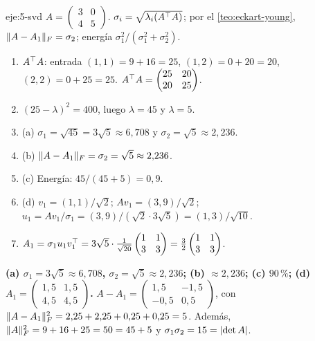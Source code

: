 \begin{solucion}{eje:5-svd}
\datos $A=\begin{pmatrix}3&0\\4&5\end{pmatrix}$.
\planteamiento $\sigma_i=\sqrt{\lambda_i(A^{\top} A)}$; por el \cref{teo:eckart-young}, $\lVert A-A_1\rVert_F=\sigma_2$; energía $\sigma_1^{2}/(\sigma_1^{2}+\sigma_2^{2})$.
\pasos
\begin{enumerate}[label=\arabic*.]
  \item $A^{\top} A$: entrada $(1,1)=9+16=25$, $(1,2)=0+20=20$, $(2,2)=0+25=25$. $A^{\top} A=\begin{pmatrix}25&20\\20&25\end{pmatrix}$.
  \item $(25-\lambda)^{2}=400$, luego $\lambda=45$ y $\lambda=5$.
  \item (a) $\sigma_1=\sqrt{45}=3\sqrt{5}\approx 6{,}708$ y $\sigma_2=\sqrt{5}\approx 2{,}236$.
  \item (b) $\lVert A-A_1\rVert_F=\sigma_2=\sqrt{5}\approx 2{,}236$.
  \item (c) Energía: $45/(45+5)=0{,}9$.
  \item (d) $v_1=(1,1)/\sqrt{2}$; $Av_1=(3,9)/\sqrt{2}$; $u_1=Av_1/\sigma_1=(3,9)/(\sqrt{2}\cdot 3\sqrt{5})=(1,3)/\sqrt{10}$.
  \item $A_1=\sigma_1u_1v_1^{\top}=3\sqrt{5}\cdot\frac{1}{\sqrt{20}}\begin{pmatrix}1&1\\3&3\end{pmatrix}=\frac32\begin{pmatrix}1&1\\3&3\end{pmatrix}$.
\end{enumerate}
\resultado \textbf{(a) $\sigma_1=3\sqrt{5}\approx 6{,}708$, $\sigma_2=\sqrt{5}\approx 2{,}236$; (b) $\approx 2{,}236$; (c) $90\,\%$; (d) $A_1=\begin{pmatrix}1{,}5&1{,}5\\4{,}5&4{,}5\end{pmatrix}$.}
\comprobacion $A-A_1=\begin{pmatrix}1{,}5&-1{,}5\\-0{,}5&0{,}5\end{pmatrix}$, con $\lVert A-A_1\rVert_F^{2}=2{,}25+2{,}25+0{,}25+0{,}25=5$. Además, $\lVert A\rVert_F^{2}=9+16+25=50=45+5$ y $\sigma_1\sigma_2=15=\lvert\det A\rvert$.
\end{solucion}

